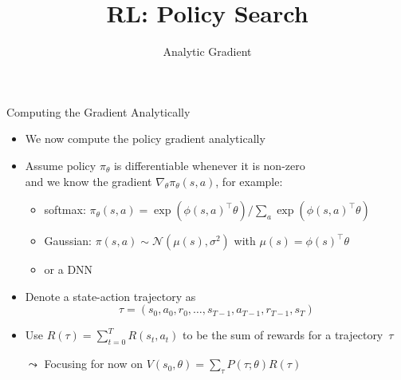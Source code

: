 \documentclass[aspectratio=169]{../latex_main/tntbeamer}  %
\title[RL: Analytic Gradient]{RL: Policy Search}
\subtitle{Analytic Gradient}
\begin{document}
	
	\maketitle

\begin{frame}[c]{Computing the Gradient Analytically}

\begin{itemize}
	\item We now compute the policy gradient analytically
	\item Assume policy $\pi_\theta$ is differentiable whenever it is non-zero\\
	 and we know the gradient $\nabla_\theta \pi_\theta (s,a)$, for example:
	 \begin{itemize}
	     \item softmax: $\pi_\theta (s,a) = \exp(\phi(s,a)^\intercal\theta) / \sum_{a} \exp(\phi(s,a)^\intercal\theta)$
	     \item Gaussian: $\pi(s,a) \sim \mathcal{N}(\mu(s), \sigma^2)$ with $\mu(s) = \phi(s)^\intercal \theta$
	     \item or a DNN
	 \end{itemize}
	\item Denote a state-action trajectory as 
	$$ \tau = (s_0, a_0, r_0, \ldots, s_{T-1}, a_{T-1}, r_{T-1}, s_T) $$
	\item Use $R(\tau) = \sum_{t=0}^{T} R(s_t, a_t)$ to be the sum of rewards for a trajectory~$\tau$
	\item[$\leadsto$] Focusing for now on $V(s_0, \theta) = \sum_\tau P(\tau; \theta) R(\tau)$ 
	
\end{itemize}

\end{frame}
\end{document}
